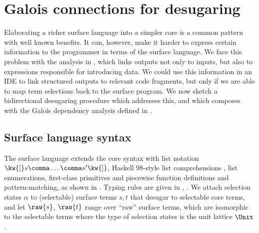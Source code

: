 \newpage
\section{Galois connections for desugaring}
\label{sec:surface-language}

Elaborating a richer surface language into a simpler core is a common pattern with well known benefits. It can, however, make it harder to express certain information to the programmer in terms of the surface language. We face this problem with the analysis in , which links outputs not only to inputs, but also to expressions responsible for introducing data. We could use this information in an IDE to link structured outputs to relevant code fragments, but only if we are able to map term selections back to the surface program. We now sketch a bidirectional desugaring procedure which addresses this, and which composes with the Galois dependency analysis defined in .



\subsection{Surface language syntax}

The surface language \OurLanguage{} extends the core syntax with list notation $\kw{[} s \comma \ldots \comma s' \kw{]}$, Haskell 98-style list comprehensions \cite{peytonJones03}, list enumerations, first-class primitives and piecewise function definitions and pattern-matching, as shown in . Typing rules are \ifappendices given in , \else \IncludedWithSupplementaryMaterial\fi. We attach selection states $\alpha$ to (selectable) surface terms $s, t$ that desugar to selectable core terms, and let $\raw{s}$, $\raw{t}$ range over ``raw'' surface terms, which are isomorphic to the selectable terms where the type of selection states is the unit lattice $\Unit$.

